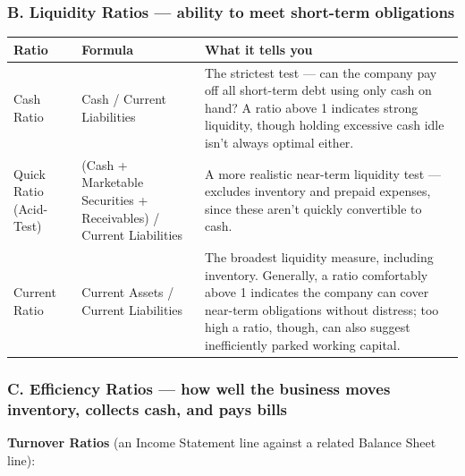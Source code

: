 \documentclass[12pt,openany]{book}
\begin{document}
\subsubsection{B. Liquidity Ratios --- ability to meet short-term obligations}

\begingroup
\small
\setlength{\tabcolsep}{4pt}
\begin{center}\begin{tabular}{|L{0.22\textwidth}|L{0.24\textwidth}|L{0.42\textwidth}|}
\hline
\textbf{Ratio} & \textbf{Formula} & \textbf{What it tells you} \\
\hline
Cash Ratio & Cash / Current Liabilities & The strictest test --- can the company pay off all short-term debt using only cash on hand? A ratio above 1 indicates strong liquidity, though holding excessive cash idle isn't always optimal either. \\
\hline
Quick Ratio (Acid-Test) & (Cash + Marketable Securities + Receivables) / Current Liabilities & A more realistic near-term liquidity test --- excludes inventory and prepaid expenses, since these aren't quickly convertible to cash. \\
\hline
Current Ratio & Current Assets / Current Liabilities & The broadest liquidity measure, including inventory. Generally, a ratio comfortably above 1 indicates the company can cover near-term obligations without distress; too high a ratio, though, can also suggest inefficiently parked working capital. \\
\hline
\end{tabular}\end{center}
\endgroup

\subsubsection{C. Efficiency Ratios --- how well the business moves inventory, collects cash, and pays bills}

\textbf{Turnover Ratios} (an Income Statement line against a related Balance Sheet line):
\end{document}
